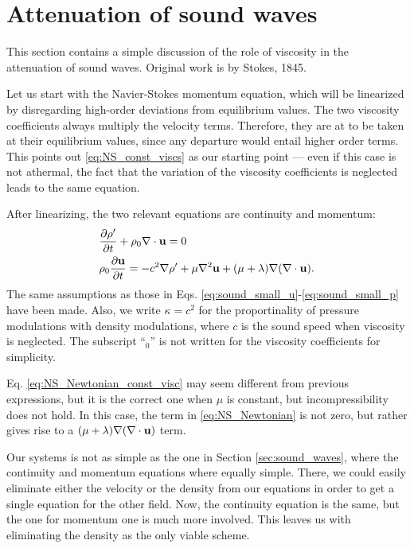 \section{Attenuation of sound waves}
\label{sec:sound_waves_att}

This section contains a simple discussion of the role of viscosity in
the attenuation of sound waves. Original work is by Stokes, 1845.

Let us start with the Navier-Stokes momentum equation, which will be
linearized by disregarding high-order deviations from equilibrium
values. The two viscosity coefficients always multiply the velocity
terms. Therefore, they are at to be taken at their equilibrium values,
since any departure would entail higher order terms. This points out
\ref{eq:NS_const_viscs} as our starting point --- even if this case
is not athermal, the fact that the variation of the viscosity
coefficients is neglected leads to the same equation.


After linearizing, the two relevant equations are continuity and
momentum:
\begin{align}
  & \frac{\partial\rho' }{\partial t}  + \rho_0 \nabla\cdot\mathbf{u} =0 \\
  & \label{eq:NS_Newtonian_const_visc}
    \rho_0 \frac{\partial \mathbf{u} }{\partial t} =
    - c^2 \nabla \rho' + \mu \nabla^2 \mathbf{u}
    + ( \mu + \lambda ) \nabla ( \nabla\cdot\mathbf{u} ) .
\end{align}
The same assumptions as those in
Eqs. \ref{eq:sound_small_u}-\ref{eq:sound_small_p} have been made.
Also, we write $\kappa = c^2$ for the proportinality of pressure
modulations with density modulations, where $c$ is the sound speed
when viscosity is neglected. The subscript ``$_0$'' is not written for
the viscosity coefficients for simplicity.

Eq. \ref{eq:NS_Newtonian_const_visc} may seem different from previous
expressions, but it is the correct one when $\mu$ is constant, but
incompressibility does not hold. In this case, the term in
\ref{eq:NS_Newtonian} is not zero, but rather gives rise to a
$(\mu + \lambda) \nabla ( \nabla\cdot\mathbf{u} )$ term.

Our systems is not as simple as the one in Section
\ref{sec:sound_waves}, where the continuity and momentum equations
where equally simple. There, we could easily eliminate either the
velocity or the density from our equations in order to get a single
equation for the other field. Now, the continuity equation is the
same, but the one for momentum one is much more involved. This leaves
us with eliminating the density as the only viable scheme.

